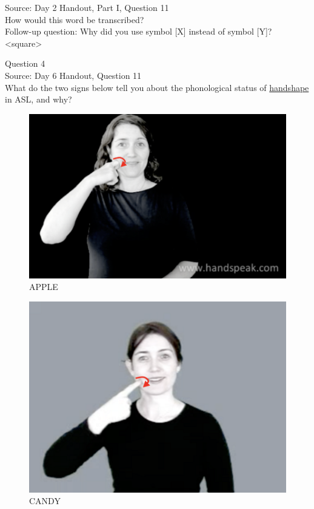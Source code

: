\documentclass[12pt]{article}
\begin{document}
Source: Day 2 Handout, Part I, Question 11\\

How would this word be transcribed?\\ Follow-up question: Why did you use symbol [X] instead of symbol [Y]?\\

<square>


\newpage

{\large Question 4}\\

Source: Day 6 Handout, Question 11\\

What do the two signs below tell you about the phonological status of \underline{handshape} in ASL, and why?\\

\begin{figure}[H]
\includegraphics{../images/asl_apple.png}
\caption{APPLE}
\end{figure}
\begin{figure}[H]
\includegraphics{../images/asl_candy.png}
\caption{CANDY}
\end{figure}
\end{document}
